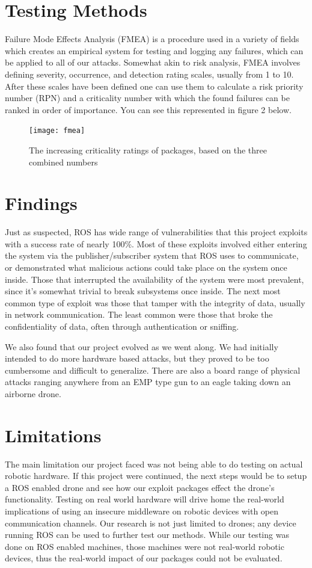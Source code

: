 \documentclass[IEEEtran,letterpaper,10pt,notitlepage,draftclsnofoot,onecolumn]{article}
\begin{document}
\section{Testing Methods}
Failure Mode Effects Analysis (FMEA) is a procedure used in a variety of fields which creates an empirical system for testing and logging any failures, which can be applied to all of our attacks. 
Somewhat akin to risk analysis, FMEA involves defining severity, occurrence, and detection rating scales, usually from 1 to 10. 
After these scales have been defined one can use them to calculate a risk priority number (RPN) and a criticality number with which the found failures can be ranked in order of importance. 
You can see this represented in figure 2 below.

\begin{figure}[h]
    \centering
    \texttt{[image: fmea]}
    \caption{The increasing criticality ratings of packages, based on the three combined numbers}
\end{figure}

\section{Findings}
Just as suspected, ROS has wide range of vulnerabilities that this project exploits with a success rate of nearly 100\%. 
Most of these exploits involved either entering the system via the publisher/subscriber system that ROS uses to communicate, or demonstrated what malicious actions could take place on the system once inside. 
Those that interrupted the availability of the system were most prevalent, since it's somewhat trivial to break subsystems once inside.
The next most common type of exploit was those that tamper with the integrity of data, usually in network communication. 
The least common were those that broke the confidentiality of data, often through authentication or sniffing.

We also found that our project evolved as we went along. 
We had initially intended to do more hardware based attacks, but they proved to be too cumbersome and difficult to generalize. 
There are also a board range of physical attacks ranging anywhere from an EMP type gun to an eagle taking down an airborne drone.

\section{Limitations}
The main limitation our project faced was not being able to do testing on actual robotic hardware. 
If this project were continued, the next steps would be to setup a ROS enabled drone and see how our exploit packages effect the drone's functionality. 
Testing on real world hardware will drive home the real-world implications of using an insecure middleware on robotic devices with open communication channels. 
Our research is not just limited to drones; any device running ROS can be used to further test our methods. 
While our testing was done on ROS enabled machines, those machines were not real-world robotic devices, thus the real-world impact of our packages could not be evaluated.
\end{document}
